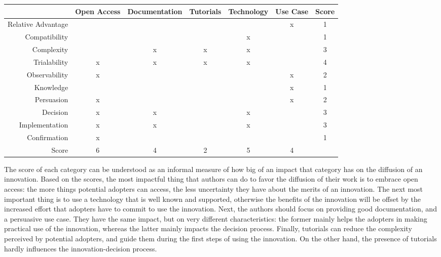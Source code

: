 \documentclass[12pt]{article}
\begin{document}
\begin{center}
\begin{tabular}{r|ccccc|c}
 & Open Access & Documentation & Tutorials & Technology & Use Case & Score\\
\hline
Relative Advantage &  &  &  &  & x & 1\\
Compatibility &  &  &  & x &  & 1\\
Complexity &  & x & x & x &  & 3\\
Trialability & x & x & x & x &  & 4\\
Observability & x &  &  &  & x & 2\\
\hline
Knowledge &  &  &  &  & x & 1\\
Persuasion & x &  &  &  & x & 2\\
Decision & x & x &  & x &  & 3\\
Implementation & x & x &  & x &  & 3\\
Confirmation & x &  &  &  &  & 1\\
\hline
Score & 6 & 4 & 2 & 5 & 4 & \\
\end{tabular}
\end{center}


The score of each category can be understood as an informal measure of how big of an impact that category has on the diffusion of an innovation. Based on the scores, the most impactful thing that authors can do to favor the diffusion of their work is to embrace open access: the more things potential adopters can access, the less uncertainty they have about the merits of an innovation. The next most important thing is to use a technology that is well known and supported, otherwise the benefits of the innovation will be offset by the increased effort that adopters have to commit to use the innovation. Next, the authors should focus on providing good documentation, and a persuasive use case. They have the same impact, but on very different characteristics: the former mainly helps the adopters in making practical use of the innovation, whereas the latter mainly impacts the decision process. Finally, tutorials can reduce the complexity perceived by potential adopters, and guide them during the first steps of using the innovation. On the other hand, the presence of tutorials hardly influences the innovation-decision process.
\end{document}
